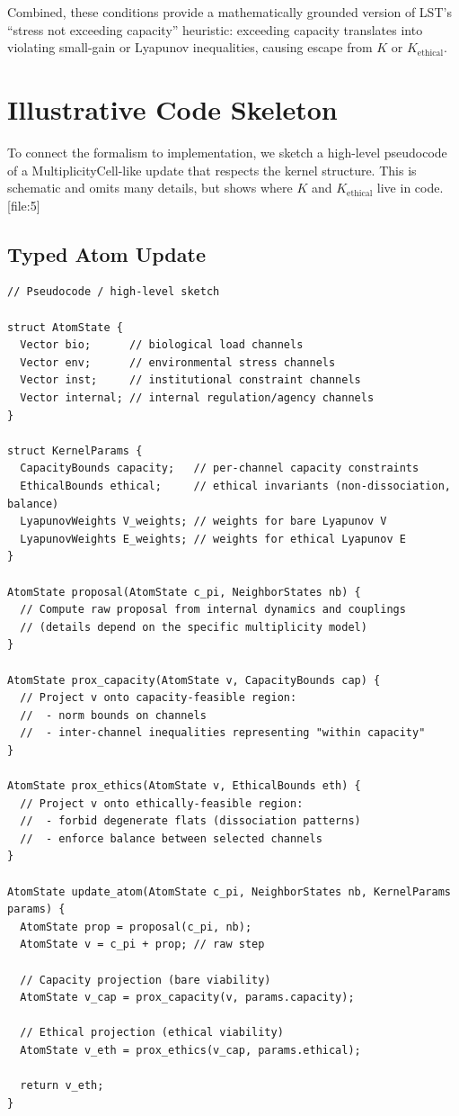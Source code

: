 \documentclass[11pt]{article}
\begin{document}
Combined, these conditions provide a mathematically grounded version of LST's ``stress not exceeding capacity'' heuristic: exceeding capacity translates into violating small-gain or Lyapunov inequalities, causing escape from \(K\) or \(K_{\text{ethical}}\).

\section{Illustrative Code Skeleton}

To connect the formalism to implementation, we sketch a high-level pseudocode of a MultiplicityCell-like update that respects the kernel structure. This is schematic and omits many details, but shows where \(K\) and \(K_{\text{ethical}}\) live in code. [file:5]

\subsection{Typed Atom Update}

\begin{verbatim}
// Pseudocode / high-level sketch

struct AtomState {
  Vector bio;      // biological load channels
  Vector env;      // environmental stress channels
  Vector inst;     // institutional constraint channels
  Vector internal; // internal regulation/agency channels
}

struct KernelParams {
  CapacityBounds capacity;   // per-channel capacity constraints
  EthicalBounds ethical;     // ethical invariants (non-dissociation, balance)
  LyapunovWeights V_weights; // weights for bare Lyapunov V
  LyapunovWeights E_weights; // weights for ethical Lyapunov E
}

AtomState proposal(AtomState c_pi, NeighborStates nb) {
  // Compute raw proposal from internal dynamics and couplings
  // (details depend on the specific multiplicity model)
}

AtomState prox_capacity(AtomState v, CapacityBounds cap) {
  // Project v onto capacity-feasible region:
  //  - norm bounds on channels
  //  - inter-channel inequalities representing "within capacity"
}

AtomState prox_ethics(AtomState v, EthicalBounds eth) {
  // Project v onto ethically-feasible region:
  //  - forbid degenerate flats (dissociation patterns)
  //  - enforce balance between selected channels
}

AtomState update_atom(AtomState c_pi, NeighborStates nb, KernelParams params) {
  AtomState prop = proposal(c_pi, nb);
  AtomState v = c_pi + prop; // raw step
  
  // Capacity projection (bare viability)
  AtomState v_cap = prox_capacity(v, params.capacity);
  
  // Ethical projection (ethical viability)
  AtomState v_eth = prox_ethics(v_cap, params.ethical);
  
  return v_eth;
}
\end{verbatim}
\end{document}
